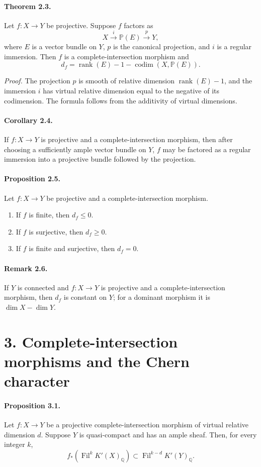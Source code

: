 \documentclass[12pt]{article}
\newcommand{\QQ}{\mathbb Q}
\newcommand{\Fil}{\operatorname{Fil}}
\newcommand{\codim}{\operatorname{codim}}
\newcommand{\rank}{\operatorname{rank}}
\newcommand{\xto}[1]{\xrightarrow{#1}}
\newcommand{\bbP}{\mathbb P}
\begin{document}
\paragraph{Theorem 2.3.} Let $f:X\to Y$ be projective. Suppose $f$ factors as
\[
X\xto{i}\bbP(E)\xto{p}Y,
\]
where $E$ is a vector bundle on $Y$, $p$ is the canonical projection, and $i$ is a regular immersion. Then $f$ is a complete-intersection morphism and
\[
d_f=\rank(E)-1-\codim(X,\bbP(E)).
\]

\emph{Proof.} The projection $p$ is smooth of relative dimension $\rank(E)-1$, and the immersion $i$ has virtual relative dimension equal to the negative of its codimension. The formula follows from the additivity of virtual dimensions.

\paragraph{Corollary 2.4.} If $f:X\to Y$ is projective and a complete-intersection morphism, then after choosing a sufficiently ample vector bundle on $Y$, $f$ may be factored as a regular immersion into a projective bundle followed by the projection.

\paragraph{Proposition 2.5.} Let $f:X\to Y$ be projective and a complete-intersection morphism.
\begin{enumerate}[label=\roman*)]
\item If $f$ is finite, then $d_f\leq0$.
\item If $f$ is surjective, then $d_f\geq0$.
\item If $f$ is finite and surjective, then $d_f=0$.
\end{enumerate}

\paragraph{Remark 2.6.} If $Y$ is connected and $f:X\to Y$ is projective and a complete-intersection morphism, then $d_f$ is constant on $Y$; for a dominant morphism it is $\dim X-\dim Y$.

\section*{3. Complete-intersection morphisms and the Chern character}

\paragraph{Proposition 3.1.} Let $f:X\to Y$ be a projective complete-intersection morphism of virtual relative dimension $d$. Suppose $Y$ is quasi-compact and has an ample sheaf. Then, for every integer $k$,
\[
f_*(\Fil^kK'(X)_\QQ)\subset\Fil^{k-d}K'(Y)_\QQ.
\]
\end{document}
